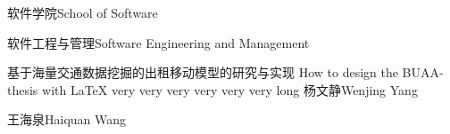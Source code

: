 
\school
{软件学院}{School of Software}

\major
{软件工程与管理}{Software Engineering and Management}

\thesistitle
{基于海量交通数据挖掘的出租移动模型的研究与实现}
{ }
{How to design the BUAA-thesis with \LaTeX{} very very very very very very long}
{ }
\thesisauthor
{杨文静}{Wenjing Yang}

\teacher
{王海泉}{Haiquan Wang}






